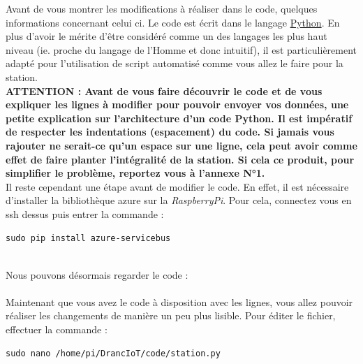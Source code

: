 Avant de vous montrer les modifications à réaliser dans le code, quelques informations concernant celui ci. Le code est écrit dans le langage \href{https://www.python.org/}{Python}. En plus d'avoir le mérite d'être considéré comme un des langages les plus haut niveau (ie. proche du langage de l'Homme et donc intuitif), il est particulièrement adapté pour l'utilisation de script automatisé comme vous allez le faire pour la station.\\

\textbf{ATTENTION : Avant de vous faire découvrir le code et de vous expliquer les lignes à modifier pour pouvoir envoyer vos données, une petite explication sur l'architecture d'un code Python. Il est impératif de respecter les indentations (espacement) du code. Si jamais vous rajouter ne serait-ce qu'un espace sur une ligne, cela peut avoir comme effet de faire planter l'intégralité de la station. Si cela ce produit, pour simplifier le problème, reportez vous à l'annexe N°1.}\\

Il reste cependant une étape avant de modifier le code. En effet, il est nécessaire d'installer la bibliothèque azure sur la \textit{RaspberryPi}. Pour cela, connectez vous en ssh dessus puis entrer la commande :\\

\begin{lstlisting}[style=MyBashStyle]
	sudo pip install azure-servicebus
\end{lstlisting}\\

Nous pouvons désormais regarder le code :\\ 
\newpage
{}\\

Maintenant que vous avez le code à disposition avec les lignes, vous allez pouvoir réaliser les changements de manière un peu plus lisible. Pour éditer le fichier, effectuer la commande :

\begin{lstlisting}[style=MyBashStyle]
	sudo nano /home/pi/DrancIoT/code/station.py
\end{lstlisting}\\

